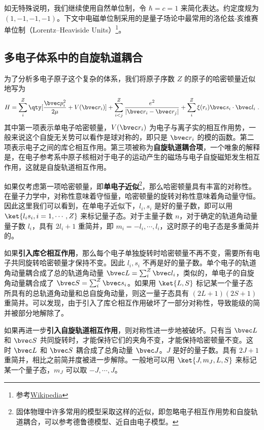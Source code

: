 

如无特殊说明，我们继续使用自然单位制，令 $\hbar=c=1$ 来简化表达。约定度规为 $(1,-1,-1,-1)$。下文中电磁单位制采用的是量子场论中最常用的洛伦兹-亥维赛单位制（Lorentz–Heaviside Units）\footnote{参考\href{https://en.wikipedia.org/wiki/Lorentz–Heaviside_units}{Wikipedia}}。


\subsection{多电子体系中的自旋轨道耦合}
\cite{黄昆}为了分析多电子原子这个复杂的体系，我们将原子序数 $Z$ 的原子的哈密顿量近似地写为
\begin{equation}
H=\sum_{i}^{Z} \qty[\frac{\bvec p_i^2}{2\mu} +V(\bvec r_i)]+\sum_{i<j}^Z \frac{e^2}{|\bvec r_i-\bvec r_j|}+\sum_i^Z \xi(r_i)\bvec s_i\cdot \bvec l_i~.
\end{equation}
其中第一项表示单电子哈密顿量，$V(\bvec r_i)$ 为电子与离子实的相互作用势，一般来说这个自旋无关势可以看作是球对称的，即只是 $\bvec r_i$ 的模的函数。第二项表示电子之间的库仑相互作用。第三项被称为\textbf{自旋轨道耦合项}，一个唯象的解释是，在电子参考系中原子核相对于电子的运动产生的磁场与电子自旋磁矩发生相互作用，这就是自旋轨道相互作用。

如果仅考虑第一项哈密顿量，即\textbf{单电子近似}\footnote{固体物理中许多常用的模型采取这样的近似，即忽略电子相互作用势和自旋轨道耦合，可以参考德鲁德模型、近自由电子模型。}，那么哈密顿量具有丰富的对称性。在量子力学中，对称性意味着守恒量，哈密顿量的旋转对称性意味着角动量守恒。因此这里我们可以看到，在单电子近似下，$l_i,s_i$ 是好的量子数，即可以用 $\ket{l_is_i,i=1,\cdots,Z}$ 来标记量子态。对于主量子数 $n$，对于确定的轨道角动量量子数 $l_i$，具有 $2 l_i+1$ 重简并，即 $m_{i}=-l_i,\cdots,l_i$，这时原子的电子态是多重简并的。

如果\textbf{引入库仑相互作用}，那么每个电子单独旋转时哈密顿量不再不变，需要所有电子共同旋转哈密顿量才保持不变。因此 $l_i,s_i$ 不再是好的量子数。单个电子的轨道角动量耦合成了总的轨道角动量 $\bvec L=\sum_i^Z \bvec l_i$，类似的，单电子的自旋角动量耦合成了 $\bvec S=\sum_i^Z \bvec s_i$。如果用 $\ket{L,S}$ 标记某一个量子态所具有的总轨道角动量和总自旋角动量，则这一量子态具有 $(2L+1)(2S+1)$ 重简并。可以发现，由于引入了库仑相互作用破坏了一部分对称性，导致能级的简并被部分地解除了。

如果再进一步\textbf{引入自旋轨道相互作用}，则对称性进一步地被破坏。只有当 $\bvec L$ 和 $\bvec S$ 共同旋转时，才能保持它们的夹角不变，才能保持哈密顿量不变。这时 $\bvec L$ 和 $\bvec S$ 耦合成了总角动量 $\bvec J$。$J$ 是好的量子数。具有 $2J+1$ 重简并，相比之前简并度被进一步解除。一般地可以用 $\ket{J,m_J,L,S}$ 来标记某一个量子态，$m_J$ 可以取 $-J,\cdots,J$。
